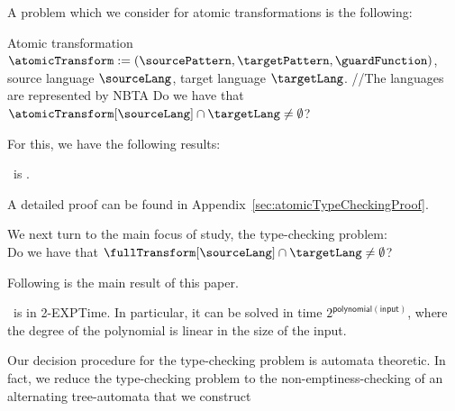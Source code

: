A problem which we consider for atomic transformations is the following:

\probdef{\typecheckingProblemFull}
{Atomic transformation $\atomicTransform := (\sourcePattern, \targetPattern, \guardFunction)$, source language $\sourceLang$,  target language $\targetLang$. {\color{gray} \slash\slash The  languages are represented by NBTA }}
{Do we have that $\atomicTransform[\sourceLang] \cap \targetLang \neq \emptyset$?}

For this, we have the following results:
\begin{theorem}\label{thm:typecheckingProblem}
    \typecheckingProblemFull\ is \exptc.
\end{theorem}

A detailed proof can be found in Appendix~\ref{sec:atomicTypeCheckingProof}. 

We next turn to the main focus of study, the type-checking problem:\\
{Do we have that $\fullTransform[\sourceLang] \cap \targetLang \neq \emptyset$?}
%

Following is the main result of this paper.
\begin{theorem}\label{thm:metaTypecheckingUpperBound}
  \metaTypecheckingProblemFull\ is in 2-EXPTime. In particular,  it can be solved in time
  $2^{\mathsf{polynomial}(\mathsf{input})}$, where the degree of the
  polynomial is linear in the size of the input. 
\end{theorem}

Our decision procedure for the type-checking problem is automata theoretic. In fact, we reduce the type-checking problem to the non-emptiness-checking of an alternating tree-automata that we construct